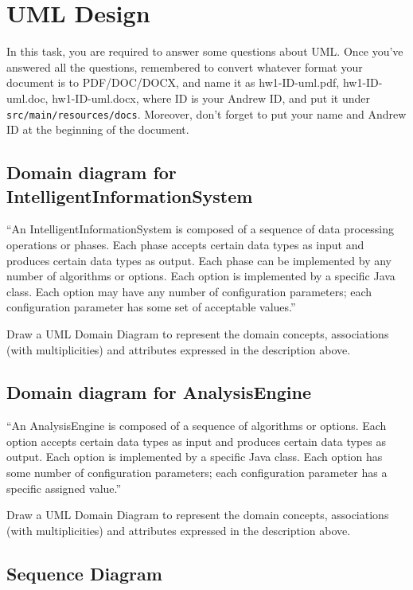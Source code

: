 
\chapter{UML Design}

In this task, you are required to answer some questions about UML. Once you've
answered all the questions, remembered to convert whatever format your document
is to PDF/DOC/DOCX, and name it as hw1-ID-uml.pdf, hw1-ID-uml.doc,
hw1-ID-uml.docx, where ID is your Andrew ID, and put it under
\texttt{src/main/resources/docs}. Moreover, don't forget to put your name and
Andrew ID at the beginning of the document.

\section{Domain diagram for IntelligentInformationSystem}

``An IntelligentInformationSystem is composed of a sequence of data processing
operations or phases. Each phase accepts certain data types as input and
produces certain data types as output. Each phase can be implemented by any
number of algorithms or options. Each option is implemented by a specific Java
class. Each option may have any number of configuration parameters; each
configuration parameter has some set of acceptable values.''

Draw a UML Domain Diagram to represent the domain concepts, associations (with
multiplicities) and attributes expressed in the description above.

\section{Domain diagram for AnalysisEngine}

``An AnalysisEngine is composed of a sequence of algorithms or options. Each
option accepts certain data types as input and produces certain data types as
output. Each option is implemented by a specific Java class. Each option has
some number of configuration parameters; each configuration parameter has a
specific assigned value.''

Draw a UML Domain Diagram to represent the domain concepts, associations (with
multiplicities) and attributes expressed in the description above.

\section{Sequence Diagram}

